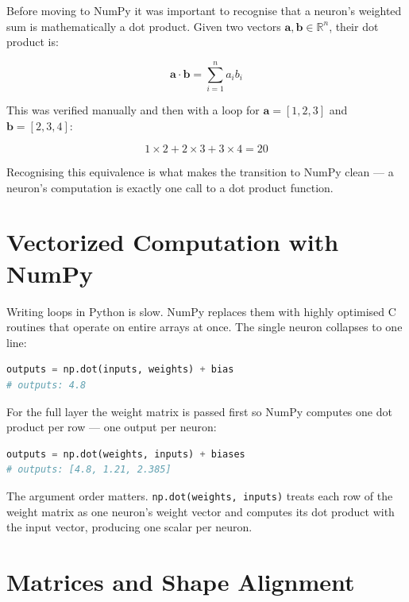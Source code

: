 \documentclass[12pt,a4paper]{report}
\begin{document}
Before moving to NumPy it was important to recognise that a neuron's weighted sum is
mathematically a dot product. Given two vectors $\mathbf{a}, \mathbf{b} \in \mathbb{R}^n$,
their dot product is:

\begin{equation}
    \mathbf{a} \cdot \mathbf{b} = \sum_{i=1}^{n} a_i b_i
\end{equation}

This was verified manually and then with a loop for $\mathbf{a} = [1, 2, 3]$
and $\mathbf{b} = [2, 3, 4]$:

\begin{equation}
    1 \times 2 + 2 \times 3 + 3 \times 4 = 20
\end{equation}

Recognising this equivalence is what makes the transition to NumPy clean —
a neuron's computation is exactly one call to a dot product function.

\section{Vectorized Computation with NumPy}

Writing loops in Python is slow. NumPy replaces them with highly optimised C routines
that operate on entire arrays at once. The single neuron collapses to one line:

\begin{lstlisting}[language=Python]
outputs = np.dot(inputs, weights) + bias
# outputs: 4.8
\end{lstlisting}

For the full layer the weight matrix is passed first so NumPy computes one dot product
per row — one output per neuron:

\begin{lstlisting}[language=Python]
outputs = np.dot(weights, inputs) + biases
# outputs: [4.8, 1.21, 2.385]
\end{lstlisting}

The argument order matters. \texttt{np.dot(weights, inputs)} treats each row of the
weight matrix as one neuron's weight vector and computes its dot product with the input
vector, producing one scalar per neuron.

\section{Matrices and Shape Alignment}
\end{document}
